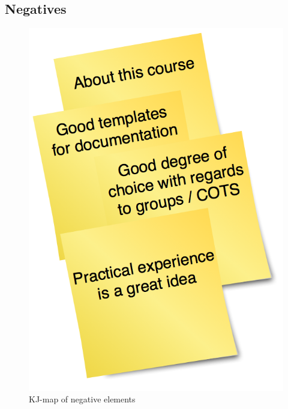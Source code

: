\documentclass[titlepage,a4paper,11pt]{article}
\begin{document}
\subsection{Negatives}
\begin{figure}
    \begin{center}
    \includegraphics[scale=0.4]{graphics/postit/POS_about_course}
    \caption{KJ-map of negative elements}
    \label{fig:negkjmap}
    \end{center}
\end{figure}
\end{document}

